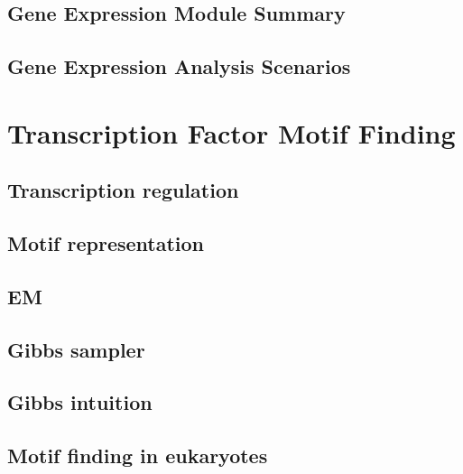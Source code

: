 \documentclass[]{book}
\begin{document}
\hypertarget{gene-expression-module-summary}{%
\section{Gene Expression Module Summary}\label{gene-expression-module-summary}}

\hypertarget{gene-expression-analysis-scenarios}{%
\section{Gene Expression Analysis Scenarios}\label{gene-expression-analysis-scenarios}}

\hypertarget{tfmf}{%
\chapter{Transcription Factor Motif Finding}\label{tfmf}}

\hypertarget{transcription-regulation}{%
\section{Transcription regulation}\label{transcription-regulation}}

\hypertarget{motif-representation}{%
\section{Motif representation}\label{motif-representation}}

\hypertarget{em}{%
\section{EM}\label{em}}

\hypertarget{gibbs-sampler}{%
\section{Gibbs sampler}\label{gibbs-sampler}}

\hypertarget{gibbs-intuition}{%
\section{Gibbs intuition}\label{gibbs-intuition}}

\hypertarget{motif-finding-in-eukaryotes}{%
\section{Motif finding in eukaryotes}\label{motif-finding-in-eukaryotes}}
\end{document}
